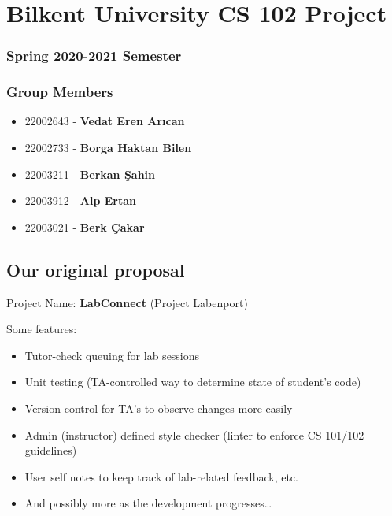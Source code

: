 \documentclass[12pt]{article}
\begin{document}
    \section*{Bilkent University CS 102
    Project}\label{bilkent-university-cs-102-project}
    
    \subsubsection*{Spring 2020-2021
    Semester}\label{spring-2020-2021-semester}
    
    \subsubsection*{Group Members}\label{group-members}
    
    \begin{itemize}
        \itemsep1pt\parskip0pt
        \item
          22002643 - \textbf{Vedat Eren Arıcan}
        \item
          22002733 - \textbf{Borga Haktan Bilen}
        \item
          22003211 - \textbf{Berkan Şahin}
        \item
          22003912 - \textbf{Alp Ertan}
        \item
          22003021 - \textbf{Berk Çakar}
    \end{itemize}
    
    \subsection*{Our original proposal}\label{our-original-proposal}
    
    Project Name: \textbf{LabConnect} \sout{(Project Labenport)} \newline
    
    \noindent Some features: 
    
    \begin{itemize}
        \itemsep1pt\parskip0pt
        \item Tutor-check queuing for lab sessions
        \item Unit testing (TA-controlled way to determine state of student's code)
        \item Version control for TA's to observe changes more easily
        \item Admin (instructor) defined style checker (linter to enforce CS 101/102 guidelines)
        \item User self notes to keep track of lab-related feedback, etc.
        \item And possibly more as the development progresses\ldots{}
    \end{itemize}
    
\end{document}
